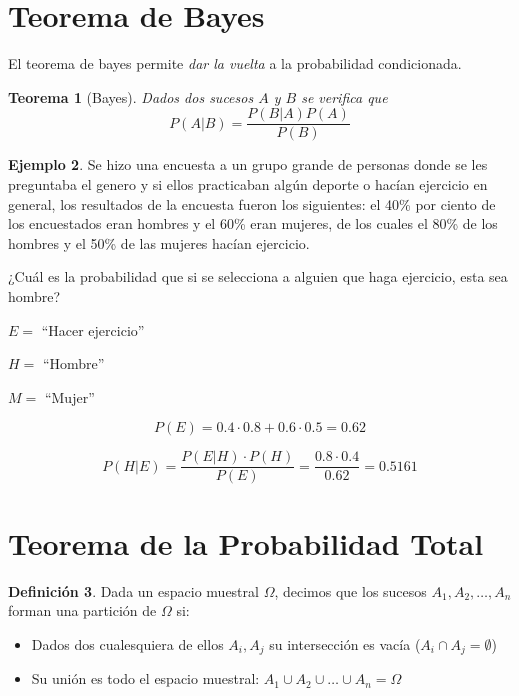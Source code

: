 \documentclass[]{book}
\providecommand{\tightlist}{%
  \setlength{\itemsep}{0pt}\setlength{\parskip}{0pt}}
\theoremstyle{plain}
\newtheorem{theorem}{Teorema}[section]
\theoremstyle{definition}
\newtheorem{definition}[theorem]{Definición}
\newtheorem{example}[theorem]{Ejemplo}
\theoremstyle{definition} %
\begin{document}
\hypertarget{teorema-de-bayes}{%
\section{Teorema de Bayes}\label{teorema-de-bayes}}

El teorema de bayes permite \emph{dar la vuelta} a la probabilidad
condicionada.

\begin{theorem}[Bayes]
  Dados dos sucesos \(A\) y \(B\) se verifica que 
  \[P(A|B) = \frac{P(B|A)P(A)}{P(B)}\]
\end{theorem}
 

\begin{example}
Se hizo una encuesta a un grupo grande de personas donde se les
preguntaba el genero y si ellos practicaban algún deporte o hacían
ejercicio en general, los resultados de la encuesta fueron los
siguientes: el 40\% por ciento de los encuestados eran hombres y el 60\%
eran mujeres, de los cuales el 80\% de los hombres y el 50\% de las
mujeres hacían ejercicio.

¿Cuál es la probabilidad que si se selecciona a alguien que haga
ejercicio, esta sea hombre?

\(E =\) ``Hacer ejercicio''

\(H =\) ``Hombre''

\(M =\) ``Mujer''

\[P(E) = 0.4\cdot 0.8 + 0.6 \cdot 0.5 = 0.62\]

\[P(H|E) = \frac{P(E|H)\cdot P(H)}{P(E)}=\frac{0.8\cdot 0.4}{0.62}=0.5161\]
 
\end{example}



\section{Teorema de la Probabilidad Total} 

\begin{definition}
Dada un espacio muestral \(\Omega\), decimos que
los sucesos \(A_1, A_2, \ldots, A_n\) forman una partición de \(\Omega\)
si:

\begin{itemize}
\tightlist
\item
  Dados dos cualesquiera de ellos \(A_i, A_j\) su intersección es vacía
  (\(A_i\cap A_j = \emptyset\))
\item
  Su unión es todo el espacio muestral:
  \(A_1 \cup A_2 \cup \ldots \cup A_n = \Omega\)
\end{itemize}
\end{definition}
\end{document}
